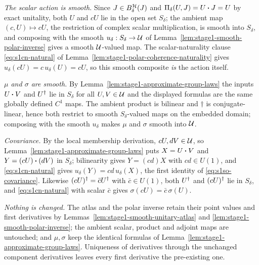 \emph{The scalar action is smooth.} Since $J\in B^{\mathcal H}_{\delta}(J)$ and
$\Pi_\delta(U,J)=U\mathbin{\bm{\cdot}} J=U$ by exact unitality, both $U$ and $cU$ lie in the open set
$S_\delta$; the ambient map $(c,U)\mapsto cU$, the restriction of complex scalar
multiplication, is smooth into $S_\delta$, and composing with the smooth
$u_\delta:S_\delta\to\mathcal U$ of Lemma~\ref{lem:stage1-smooth-polar-inverse} gives a smooth
$\mathcal U$-valued map. The scalar-naturality clause \eqref{eq:s1cn-natural} of
Lemma~\ref{lem:stage1-polar-coherence-naturality} gives $u_\delta(cU)=c\,u_\delta(U)=cU$,
so this smooth composite \emph{is} the action itself.

\emph{$\mu$ and $\sigma$ are smooth.} By Lemma~\ref{lem:stage1-approximate-group-laws} the
inputs $U\mathbin{\bm{\cdot}} V$ and $U^{\dagger}$ lie in $S_\delta$ for all $U,V\in\mathcal U$ and the displayed
formulas are the same globally defined $C^{1}$ maps. The ambient product is bilinear and
$\dagger$ is conjugate-linear, hence both restrict to smooth $S_\delta$-valued maps on the
embedded domain; composing with the smooth $u_\delta$ makes $\mu$ and $\sigma$ smooth into
$\mathcal U$.

\emph{Covariance.} By the local membership derivation, $cU,dV\in\mathcal U$, so
Lemma~\ref{lem:stage1-approximate-group-laws} puts $X=U\mathbin{\bm{\cdot}} V$ and
$Y=(cU)\mathbin{\bm{\cdot}}(dV)$ in $S_\delta$; bilinearity gives $Y=(cd)X$ with $cd\in U(1)$, and
\eqref{eq:s1cn-natural} gives $u_\delta(Y)=cd\,u_\delta(X)$, the first identity of
\eqref{eq:s1so-covariance}. Likewise $(cU)^{\dagger}=\bar cU^{\dagger}$ with $\bar c\in U(1)$, both
$U^{\dagger}$ and $(cU)^{\dagger}$ lie in $S_\delta$, and \eqref{eq:s1cn-natural} with scalar $\bar c$
gives $\sigma(cU)=\bar c\,\sigma(U)$.

\emph{Nothing is changed.} The atlas and the polar inverse retain their point values and
first derivatives by Lemmas~\ref{lem:stage1-smooth-unitary-atlas} and
\ref{lem:stage1-smooth-polar-inverse}; the ambient scalar, product and adjoint maps are
untouched; and $\mu,\sigma$ keep the identical formulas of
Lemma~\ref{lem:stage1-approximate-group-laws}. Uniqueness of derivatives through the
unchanged component derivatives leaves every first derivative the pre-existing one.

